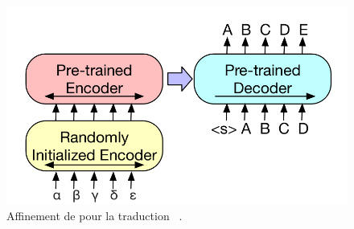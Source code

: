 \begin{figure}[hbt]
    \centering
    \includegraphics[width=.8\textwidth]{assets/images/bart-mt.png}
    \caption[Affinement de  pour la traduction.]
    {Affinement de  pour la traduction%
    ~\cite{Lewis_Liu_Goyal_Ghazvininejad_Mohamed_Levy_Stoyanov_Zettlemoyer_2019}.}
    \label{fig.bart-mt}
\end{figure}
